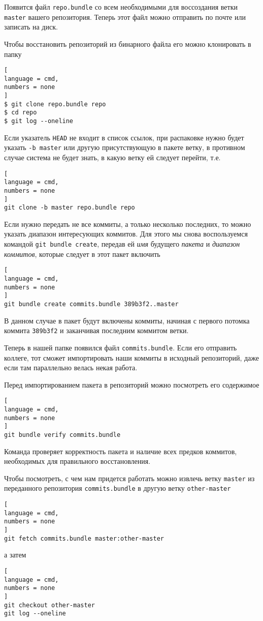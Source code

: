 \documentclass[%
	11pt,
	a4paper,
	utf8,
		]{article}
\begin{document}
Появится файл \texttt{repo.bundle} со всем необходимыми для воссоздания ветки \texttt{master} вашего репозитория. Теперь этот файл можно отправить по почте или записать на диск. 

Чтобы восстановить репозиторий из бинарного файла его можно клонировать в папку 
\begin{lstlisting}[
language = cmd,
numbers = none
]
$ git clone repo.bundle repo
$ cd repo
$ git log --oneline
\end{lstlisting}

Если указатель \texttt{HEAD} не входит в список ссылок, при распаковке нужно будет указать \verb|-b master| или другую присутствующую в пакете ветку, в противном случае система не будет знать, в какую ветку ей следует перейти, т.е.
\begin{lstlisting}[
language = cmd,
numbers = none
]
git clone -b master repo.bundle repo
\end{lstlisting}

Если нужно передать не все коммиты, а только несколько последних, то можно указать диапазон интересующих коммитов. Для этого мы снова воспользуемся командой \texttt{git bundle create}, передав ей \emph{имя} будущего \emph{пакета} и \emph{диапазон коммитов}, которые следует в этот пакет включить
\begin{lstlisting}[
language = cmd,
numbers = none
]
git bundle create commits.bundle 389b3f2..master
\end{lstlisting}

В данном случае в пакет будут включены коммиты, начиная с первого потомка коммита \texttt{389b3f2} и заканчивая последним коммитом ветки.

Теперь в нашей папке появился файл \texttt{commits.bundle}. Если его отправить коллеге, тот сможет импортировать наши коммиты в исходный репозиторий, даже если там параллельно велась некая работа.

Перед импортированием пакета в репозиторий можно посмотреть его содержимое
\begin{lstlisting}[
language = cmd,
numbers = none
]
git bundle verify commits.bundle
\end{lstlisting}

Команда проверяет корректность пакета и наличие всех предков коммитов, необходимых для правильного восстановления.

Чтобы посмотреть, с чем нам придется работать можно извлечь ветку \texttt{master} из переданного репозитория \texttt{commits.bundle} в другую ветку \texttt{other-master}
\begin{lstlisting}[
language = cmd,
numbers = none
]
git fetch commits.bundle master:other-master
\end{lstlisting}
а затем
\begin{lstlisting}[
language = cmd,
numbers = none
]
git checkout other-master
git log --oneline
\end{lstlisting}
\end{document}
